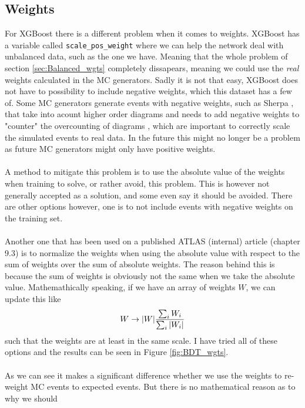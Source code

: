 \documentclass[14pt, a4paper]{book}
\begin{document}
\subsection{Weights}
For XGBoost there is a different problem when it comes to weights. XGBoost has a variable called \verb|scale_pos_weight| where we can help the network deal with unbalanced data, such as the one we have. 
Meaning that the whole problem of section \ref{sec:Balanced_wgts} completely dissapears, meaning we could use the \textit{real} weights calculated in the MC generators.
Sadly it is not that easy, XGBoost does not have to possibility to include negative weights, which this dataset has a few of. Some MC generators generate events with negative weights, such as Sherpa , that take into acount higher order diagrams and needs to add 
negative weights to "counter" the overcounting of diagrams \cite{Negative_Weights_article}, which are important to correctly scale the simulated events to real data.
In the future this might no longer be a problem as  future MC generators might only have positive weights.\\
\\A method to mitigate this problem is to use the absolute value of the weights when training to solve, or rather avoid, this problem. 
This is however not generally accepted as a solution, and some even say it should be avoided. There are other options however, one is to not include events with negative weights on the training set. \\
\\Another one that has been used on a published ATLAS (internal) article (chapter 9.3) \cite{Abbott:2714377} is to normalize the weights when using the absolute value with respect to the sum of weights over the sum of absolute weights. The reason behind this is because the sum of weights is obviously not the same when we take the absolute value. 
Mathemathically speaking, if we have an array of weights $W$, we can update this like
\begin{equation}\label{eq:ATLAS_wgt}
   W \rightarrow \abs{W}\frac{\sum_i W_i}{\sum_i\abs{W_i}}
\end{equation}
such that the weights are at least in the same scale. I have tried all of these options and the results can be seen in Figure \ref{fig:BDT_wgts}.\\
\\As we can see it makes a significant difference whether we use the weights to re-weight MC events to expected events. But there is no mathematical reason as to why we should 
\end{document}
